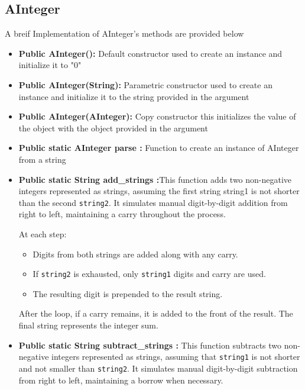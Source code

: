 \documentclass{article}
\begin{document}
\subsection{AInteger}
A breif Implementation of AInteger's methods are provided below \\
\begin{itemize}
    
    \item \textbf{Public AInteger():} Default constructor used to create an instance and initialize it to "0"\\
    
    \item \textbf{Public AInteger(String):} Parametric constructor used to create an instance and initialize it to the string provided in the argument\\
    
    \item \textbf{Public AInteger(AInteger):} Copy constructor this initializes the value of the object with the object provided in the argument\\
    
    \item  \textbf{Public static AInteger parse :} Function to create an instance of AInteger from a string\\
    
    \item \textbf{Public static String add\_strings :}This function adds two non-negative integers represented as strings, assuming the first string string1 is not shorter than the second \texttt{string2}. It simulates manual digit-by-digit addition from right to left, maintaining a carry throughout the process.

    At each step:
    \begin{itemize}
        \item Digits from both strings are added along with any carry.
        \item If \texttt{string2} is exhausted, only \texttt{string1} digits and carry are used.
        \item The resulting digit is prepended to the result string.
    \end{itemize}
    After the loop, if a carry remains, it is added to the front of the result. The final string represents the integer sum.\\
    
    \item \textbf{Public static String subtract\_strings :} This function subtracts two non-negative integers represented as strings, assuming that \texttt{string1} is not shorter and not smaller than \texttt{string2}. It simulates manual digit-by-digit subtraction from right to left, maintaining a borrow when necessary.


\end{itemize}
\end{document}
